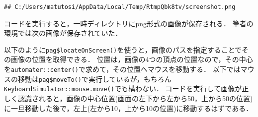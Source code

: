 \documentclass[
]{article}
\newenvironment{Shaded}{\begin{snugshade}}{\end{snugshade}}
\newcommand{\AttributeTok}[1]{\textcolor[rgb]{0.13,0.29,0.53}{#1}}
\newcommand{\CommentTok}[1]{\textcolor[rgb]{0.56,0.35,0.01}{\textit{#1}}}
\newcommand{\DecValTok}[1]{\textcolor[rgb]{0.00,0.00,0.81}{#1}}
\newcommand{\FunctionTok}[1]{\textcolor[rgb]{0.13,0.29,0.53}{\textbf{#1}}}
\newcommand{\NormalTok}[1]{#1}
\newcommand{\OtherTok}[1]{\textcolor[rgb]{0.56,0.35,0.01}{#1}}
\newcommand{\SpecialCharTok}[1]{\textcolor[rgb]{0.81,0.36,0.00}{\textbf{#1}}}
\newcommand{\StringTok}[1]{\textcolor[rgb]{0.31,0.60,0.02}{#1}}
\begin{document}
\begin{Shaded}
\end{Shaded}

\begin{verbatim}
## C:/Users/matutosi/AppData/Local/Temp/RtmpQbk8tv/screenshot.png
\end{verbatim}

コードを実行すると，一時ディレクトリにpng形式の画像が保存される．
筆者の環境では次の画像が保存されていた．

以下のように\texttt{pag\$locateOnScreen()}を使うと，画像のパスを指定することでその画像の位置を取得できる．
位置は，画像の4つの頂点の位置なので，その中心を\texttt{automater::center()}で求めて，その位置へマウスを移動する．
以下ではマウスの移動は\texttt{pag\$moveTo()}で実行しているが，もちろん\texttt{KeyboardSimulator::mouse.move()}でも構わない．
コードを実行して画像が正しく認識されると，画像の中心位置(画面の左下から左から50，上から50の位置)に一旦移動した後で，左上(左から10，上から10の位置)に移動するはずである．

\begin{Shaded}
\end{Shaded}
\end{document}
